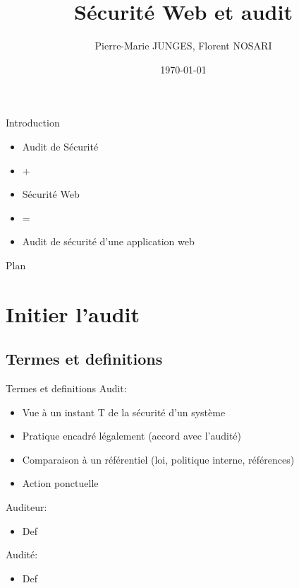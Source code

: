 \documentclass{beamer}
\title{Sécurité Web et audit}
\author{Pierre-Marie JUNGES, Florent NOSARI}
\institute[UL] {
	Université de Lorraine \\
}
\date{\today}
\begin{document}
  \begin{frame}
  	\titlepage 
  \end{frame}

\begin{frame}{Introduction}
	\begin{itemize}
		\item Audit de Sécurité
		\item +
		\item Sécurité Web
		\item = 
		\item Audit de sécurité d'une application web
	\end{itemize}
\end{frame}

\begin{frame}{Plan}
	\tableofcontents
\end{frame}


\section{Initier l'audit}

	\subsection{Termes et definitions}
	\begin{frame}{Termes et definitions}
		Audit:
		\begin{itemize}
			\setlength{\itemindent}{+.2in}
			\item Vue à un instant T de la sécurité d'un système
			\item Pratique encadré légalement (accord avec l'audité)
			\item Comparaison à un référentiel (loi, politique interne, références)
			\item Action ponctuelle
		\end{itemize}
		Auditeur:
				\begin{itemize}
					\setlength{\itemindent}{+.2in}
			\item Def
		\end{itemize}
		Audité:
				\begin{itemize}
					\setlength{\itemindent}{+.2in}
			\item Def
		\end{itemize}
	\end{frame}
\end{document}
